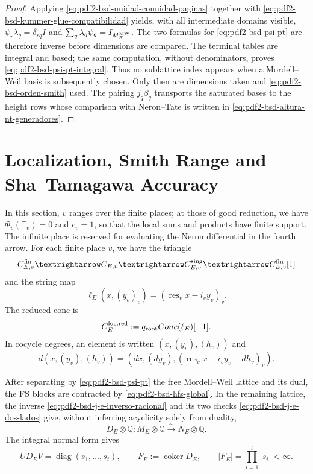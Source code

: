 \begin{proof}
Applying \eqref{eq:pdf2-bsd-unidad-counidad-paginas} together with \eqref{eq:pdf2-bsd-kummer-glue-compatibilidad} yields, with all intermediate domains visible, $\psi_r\lambda_q=\delta_{rq}I$ and $\sum_q\lambda_q\psi_q=I_{M_E^{\rm MW}}$. The two formulas for \eqref{eq:pdf2-bsd-psi-pt} are therefore inverse before dimensions are compared. The terminal tables are integral and based; the same computation, without denominators, proves \eqref{eq:pdf2-bsd-psi-pt-integral}. Thus no sublattice index appears when a Mordell--Weil basis is subsequently chosen. Only then are dimensions taken and \eqref{eq:pdf2-bsd-orden-smith} used. The pairing $j_q\bar\beta_q$ transports the saturated bases to the height rows whose comparison with Neron--Tate is written in \eqref{eq:pdf2-bsd-altura-nt-generadores}.
\end{proof}

\section{Localization, Smith Range and Sha--Tamagawa Accuracy}

In this section, $v$ ranges over the finite places; at those of good reduction,
we have $\Phi_v(\mathbb F_v)=0$ and $c_v=1$, so that the local sums and products
have finite support. The infinite place is reserved for evaluating
the Neron differential in the fourth arrow. For each finite place $v$,
we have the triangle
\[
 \mathcal C_{E,v}^{\rm fin}\to\mathcal C_{E,v}\to
 \mathcal C_{E,v}^{\rm sing}\to\mathcal C_{E,v}^{\rm fin}[1]
\]
and the string map
\begin{equation}\label{eq:pdf2-bsd-ell-e}
 \ell_E(x,(y_v)_v)=(\operatorname{res}_vx-i_vy_v)_v.
\end{equation}
The reduced cone is
\begin{equation}\label{eq:pdf2-bsd-cono-reducido}
 \mathcal C_E^{\rm loc,red}:=
 q_{\rm root}\operatorname{Cone}(\ell_E)[-1].
\end{equation}
In cocycle degrees, an element is written $(x,(y_v),(h_v))$ and
\begin{equation}\label{eq:pdf2-bsd-diferencial-cono}
 d(x,(y_v),(h_v))=
 (dx,(dy_v),(\operatorname{res}_vx-i_vy_v-dh_v)_v).
\end{equation}

After separating by \eqref{eq:pdf2-bsd-psi-pt} the free Mordell--Weil lattice
and its dual, the FS blocks are contracted by
\eqref{eq:pdf2-bsd-hfs-global}. In the remaining lattice, the inverse
\eqref{eq:pdf2-bsd-j-e-inverso-racional} and its two checks
\eqref{eq:pdf2-bsd-j-e-dos-lados} give, without inferring acyclicity solely from
duality,
\begin{equation}\label{eq:pdf2-bsd-rango-completo}
 D_E\otimes\mathbb Q:M_E\otimes\mathbb Q
 \xrightarrow{\sim}N_E\otimes\mathbb Q.
\end{equation}
The integral normal form gives
\begin{equation}\label{eq:pdf2-bsd-smith-finito}
 UD_EV=\operatorname{diag}(s_1,\ldots,s_t),
 \qquad
 F_E:=\operatorname{coker}D_E,
 \qquad |F_E|=\prod_{i=1}^t|s_i|<\infty.
\end{equation}

